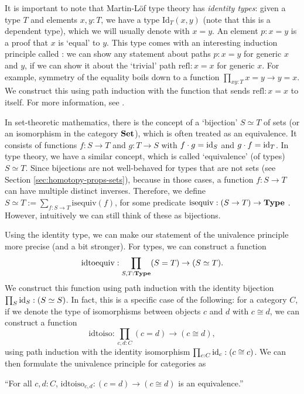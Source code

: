 It is important to note that Martin-Löf type theory has \textit{identity types}: given a type $ T $ and elements $ x, y: T $, we have a type $ \mathrm{Id}_T(x, y) $ (note that this is a dependent type), which we will usually denote with $ x = y $. An element $ p: x = y $ is a proof that $ x $ is `equal' to $ y $. This type comes with an interesting induction principle called : we can show any statement about paths $ p: x = y $ for generic $ x $ and $ y $, if we can show it about the `trivial' path $ \mathrm{refl}: x = x $ for generic $ x $. For example, symmetry of the equality boils down to a function $ \prod_{x y : T} x = y \to y = x $. We construct this using path induction with the function that sends $ \mathrm{refl}: x = x $ to itself. For more information, see \autocite[][Section 1.12.1]{hottbook}.

In set-theoretic mathematics, there is the concept of a `bijection' $ S \simeq T $ of sets (or an isomorphism in the category $ \mathbf{Set} $), which is often treated as an equivalence. It consists of functions $ f: S \to T $ and $ g: T \to S $ with $ f \cdot g = \text{id}_{S} $ and $ g \cdot f = \text{id}_{T} $. In type theory, we have a similar concept, which is called `equivalence' (of types) $ S \simeq T $. Since bijections are not well-behaved for types that are not sets (see Section \ref{sec:homotopy-props-sets}), because in those cases, a function $ f: S \to T $ can have multiple distinct inverses. Therefore, we define $ S \simeq T := \sum_{f: S \to T} \mathrm{isequiv}(f) $, for some predicate $ \mathrm{isequiv}: (S \to T) \to \mathbf{Type} $ \autocite[][Equation 2.4.10]{hottbook}. However, intuitively we can still think of these as bijections.

Using the identity type, we can make our statement of the univalence principle more precise (and a bit stronger). For types, we can construct a function
\[ \mathrm{idtoequiv}: \prod_{S, T: \mathbf{Type}} (S = T) \to (S \simeq T). \]
We construct this function using path induction with the identity bijection $ \prod_S \text{id}_{S}: (S \simeq S) $. In fact, this is a specific case of the following: for a category $ C $, if we denote the type of isomorphisms between objects $ c $ and $ d $ with $ c \cong d $, we can construct a function
\[ \mathrm{idtoiso}: \prod_{c, d: C} (c = d) \to (c \cong d), \]
using path induction with the identity isomorphism $ \prod_{c: C} \text{id}_{c}: (c \cong c) $. We can then formulate the univalence principle for categories as

\enquote{For all $ c, d : C $, $ \mathrm{idtoiso}_{c, d}: (c = d) \to (c \cong d) $ is an equivalence.}

